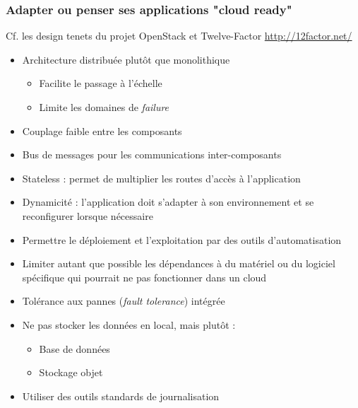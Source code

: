   \begin{frame}[allowframebreaks]
    \frametitle{Adapter ou penser ses applications "cloud ready"}
    Cf. les design tenets du projet OpenStack et Twelve-Factor \url{http://12factor.net/}
    \begin{itemize}
      \item Architecture distribuée plutôt que monolithique
      \begin{itemize}
        \item Facilite le passage à l'échelle
        \item Limite les domaines de \textit{failure}
      \end{itemize}\pause
      \item Couplage faible entre les composants
      \item Bus de messages pour les communications inter-composants\framebreak
      \item Stateless : permet de multiplier les routes d'accès à l'application\pause
      \item Dynamicité : l'application doit s'adapter à son environnement et se reconfigurer lorsque nécessaire\pause
      \item Permettre le déploiement et l'exploitation par des outils d'automatisation\pause
      \item Limiter autant que possible les dépendances à du matériel ou du logiciel spécifique qui pourrait ne pas fonctionner dans un cloud\pause
      \item Tolérance aux pannes (\textit{fault tolerance}) intégrée\pause
      \item Ne pas stocker les données en local, mais plutôt :
      \begin{itemize}
        \item Base de données
        \item Stockage objet
      \end{itemize}\pause
      \item Utiliser des outils standards de journalisation
    \end{itemize}
  \end{frame}
